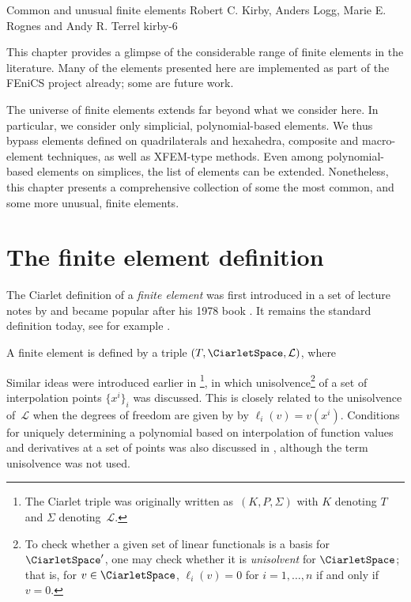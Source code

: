               {Common and unusual finite elements}
              {Robert C. Kirby, Anders Logg, Marie E. Rognes and Andy R. Terrel}
              {kirby-6}

\newcommand{\elmfigsizesingle}{5.4cm}
\newcommand{\elmfigsizedouble}{5.4cm}
\newcommand{\elmfigsizetriple}{3.5cm}
\newcommand{\elmfigsizequadruple}{2.6cm}
\newcommand{\elmfig}[1]{\texttt{[image: chapters/kirby-6/png/\#1.png]}}
\newcommand{\elmdesc}[1]{\begin{minipage}{4cm} #1 \end{minipage} \\ }

This chapter provides a glimpse of the considerable range of finite
elements in the literature. Many of the elements presented here are
implemented as part of the FEniCS project already; some are future work.

The universe of finite elements extends far beyond what we consider
here. In particular, we consider only simplicial, polynomial-based
elements. We thus bypass elements defined on quadrilaterals and hexahedra,
composite and macro-element techniques, as well as XFEM-type methods. Even
among polynomial-based elements on simplices, the list of elements can be
extended. Nonetheless, this chapter presents a comprehensive collection
of some the most common, and some more unusual, finite elements.

\section{The finite element definition}

The Ciarlet definition of a \emph{finite element} was first introduced in
a set of lecture notes by \citet{Ciarlet1975} and became popular after
his 1978 book \citep{Ciarlet2002}. It remains the standard definition
today, see for example \citet{BrennerScott2008}.
\begin{definition}
  A finite element is defined by a triple
  $(T, \CiarletSpace,\mathcal{L})$, where
  \femdefinition{}
\end{definition}
Similar ideas were introduced earlier in
\citet{CiarletRaviart1972}\footnote{The Ciarlet triple was originally
  written as~$(K, P, \Sigma)$ with $K$ denoting $T$ and $\Sigma$
  denoting~$\mathcal{L}$.}, in which unisolvence\footnote{To check
  whether a given set of linear functionals is a basis for
  $\CiarletSpace'$, one may check whether it is \emph{unisolvent} for
  $\CiarletSpace$; that is, for $v \in \CiarletSpace$, $\ell_i(v) = 0$
  for $i = 1, \dots, n$ if and only if $v = 0$.} of a set of
interpolation points $\{x^i\}_i$ was discussed. This is closely
related to the unisolvence of~$\mathcal{L}$ when the degrees of
freedom are given by by $\ell_i(v) = v(x^i)$.  Conditions for uniquely
determining a polynomial based on interpolation of function values and
derivatives at a set of points was also discussed in
\citet{BrambleZlamal1970}, although the term unisolvence was not used.

